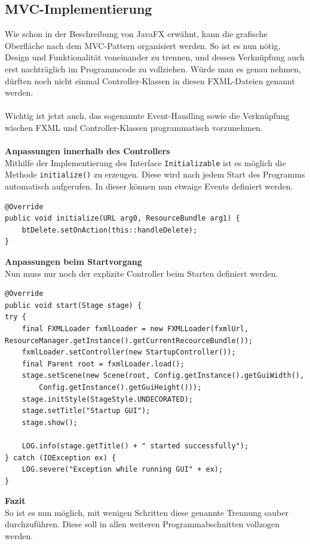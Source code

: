 \subsection{MVC-Implementierung}\label{subsec:mvc}
Wie schon in der Beschreibung von JavaFX erwähnt, kann die grafische Oberfläche nach dem MVC-Pattern organisiert werden.
So ist es nun nötig, Design und Funktionalität voneinander zu trennen, und dessen Verknüpfung auch erst nachträglich im Programmcode zu vollziehen.
Würde man es genau nehmen, dürften noch nicht einmal Controller-Klassen in diesen FXML-Dateien genannt werden.\\\\
Wichtig ist jetzt auch, das sogenannte Event-Handling sowie die Verknüpfung wischen FXML und Controller-Klassen programmatisch vorzunehmen.\\\\
\textbf{Anpassungen innerhalb des Controllers}\\
Mithilfe der Implementierung des Interface \lstinline[style=java]{Initializable} ist es möglich die Methode \lstinline[style=java]{initialize()} zu erzeugen.
Diese wird nach jedem Start des Programms automatisch aufgerufen.
In dieser können nun etwaige Events definiert werden.
\begin{lstlisting}[style=java,caption=Methode initialize(),label=loggerOutput]
@Override
public void initialize(URL arg0, ResourceBundle arg1) {
    btDelete.setOnAction(this::handleDelete);
}
\end{lstlisting}
\textbf{Anpassungen beim Startvorgang}\\
Nun muss nur noch der explizite Controller beim Starten definiert werden.
\begin{lstlisting}[style=java,caption=Methode start(),label=loggerOutput]
@Override
public void start(Stage stage) {
try {
    final FXMLLoader fxmlLoader = new FXMLLoader(fxmlUrl, ResourceManager.getInstance().getCurrentRecourceBundle());
    fxmlLoader.setController(new StartupController());
    final Parent root = fxmlLoader.load();
    stage.setScene(new Scene(root, Config.getInstance().getGuiWidth(),
        Config.getInstance().getGuiHeight()));
    stage.initStyle(StageStyle.UNDECORATED);
    stage.setTitle("Startup GUI");
    stage.show();

    LOG.info(stage.getTitle() + " started successfully");
} catch (IOException ex) {
    LOG.severe("Exception while running GUI" + ex);
}
\end{lstlisting}
\textbf{Fazit}\\
So ist es nun möglich, mit wenigen Schritten diese genannte Trennung sauber durchzuführen.
Diese soll in allen weiteren Programmabschnitten vollzogen werden.
